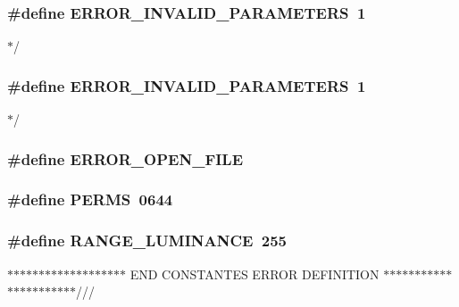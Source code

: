 \subsubsection[{ERROR\_\-INVALID\_\-PARAMETERS}]{\setlength{\rightskip}{0pt plus 5cm}\#define ERROR\_\-INVALID\_\-PARAMETERS~1}\label{d0/d29/main_8c_a7656f0e76a5a4f4aa72fcb0afc3a2298}


$\ast$/ 

\subsubsection[{ERROR\_\-INVALID\_\-PARAMETERS}]{\setlength{\rightskip}{0pt plus 5cm}\#define ERROR\_\-INVALID\_\-PARAMETERS~1}\label{d0/d29/main_8c_a7656f0e76a5a4f4aa72fcb0afc3a2298}


$\ast$/ 

\subsubsection[{ERROR\_\-OPEN\_\-FILE}]{\setlength{\rightskip}{0pt plus 5cm}\#define ERROR\_\-OPEN\_\-FILE}\label{d0/d29/main_8c_a18acdce401ee0e52073166b285b3c56e}
\subsubsection[{PERMS}]{\setlength{\rightskip}{0pt plus 5cm}\#define PERMS~0644}\label{d0/d29/main_8c_afee0dce2271f56a18b4656548b2de8cc}
\subsubsection[{RANGE\_\-LUMINANCE}]{\setlength{\rightskip}{0pt plus 5cm}\#define RANGE\_\-LUMINANCE~255}\label{d0/d29/main_8c_a027288799bd249e133a0cd507fb2f08b}


$\ast$$\ast$$\ast$$\ast$$\ast$$\ast$$\ast$$\ast$$\ast$$\ast$$\ast$$\ast$$\ast$$\ast$$\ast$$\ast$$\ast$$\ast$$\ast$ END CONSTANTES ERROR DEFINITION $\ast$$\ast$$\ast$$\ast$$\ast$$\ast$$\ast$$\ast$$\ast$$\ast$$\ast$$\ast$$\ast$$\ast$$\ast$$\ast$$\ast$$\ast$$\ast$$\ast$$\ast$$\ast$/// 

